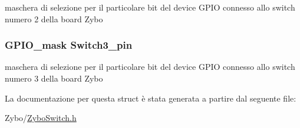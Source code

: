 maschera di selezione per il particolare bit del device G\+P\+I\+O connesso allo switch numero 2 della board Zybo \hypertarget{struct_zybo_switch__t_a6b95420b88fe8c1fd7f347ce3ae1906b}{
\subsubsection[{Switch3\+\_\+pin}]{\setlength{\rightskip}{0pt plus 5cm}G\+P\+I\+O\+\_\+mask Switch3\+\_\+pin}}\label{struct_zybo_switch__t_a6b95420b88fe8c1fd7f347ce3ae1906b}
maschera di selezione per il particolare bit del device G\+P\+I\+O connesso allo switch numero 3 della board Zybo 

La documentazione per questa struct è stata generata a partire dal seguente file\+:\begin{DoxyCompactItemize}
\item 
Zybo/\hyperlink{_zybo_switch_8h}{Zybo\+Switch.\+h}\end{DoxyCompactItemize}
